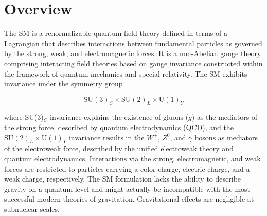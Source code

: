 \section{Overview}
\label{sec:sm_overview}

The SM is a renormalizable quantum field theory defined in terms of a Lagrangian that describes interactions between fundamental particles as governed by the strong, weak, and electromagnetic forces. It is a non-Abelian gauge theory comprising interacting field theories based on gauge invariance constructed within the framework of quantum mechanics and special relativity. The SM exhibits invariance under the symmetry group

\begin{equation}
    \text{SU}(3)_C \times \text{SU}(2)_L \times \text{U}(1)_Y
\end{equation}

where SU(3)$_C$ invariance explains the existence of gluons ($g$) as the mediators of the strong force, described by quantum electrodynamics (QCD), and the $\text{SU}(2)_L \times \text{U}(1)_Y$ invariance results in the $W^\pm$, $Z^0$, and $\gamma$ bosons as mediators of the electroweak force, described by the unified electroweak theory and quantum electrodynamics. Interactions via the strong, electromagnetic, and weak forces are restricted to particles carrying a color charge, electric charge, and a weak charge, respectively. The SM formulation lacks the ability to describe gravity on a quantum level and might actually be incompatible with the most successful modern theories of gravitation. Gravitational effects are negligible at subnuclear scales.




